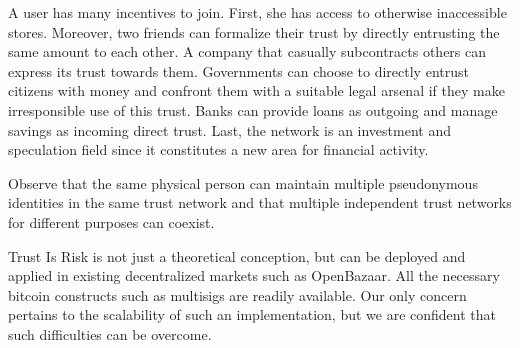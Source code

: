   A user has many incentives to join. First, she has access to otherwise inaccessible stores. Moreover, two friends can
  formalize their trust by directly entrusting the same amount to each other. A company that casually subcontracts others can
  express its trust towards them. Governments can choose to directly entrust citizens with money and confront them with a
  suitable legal arsenal if they make irresponsible use of this trust. Banks can provide loans as outgoing and manage
  savings as incoming direct trust. Last, the network is an investment and speculation field since it constitutes a new area
  for financial activity.

  Observe that the same physical person can maintain multiple pseudonymous identities in the same trust network and that
  multiple independent trust networks for different purposes can coexist.

  Trust Is Risk is not just a theoretical conception, but can be deployed and applied in existing decentralized markets such
  as OpenBazaar. All the necessary bitcoin constructs such as multisigs are readily available. Our only concern pertains to
  the scalability of such an implementation, but we are confident that such difficulties can be overcome.
